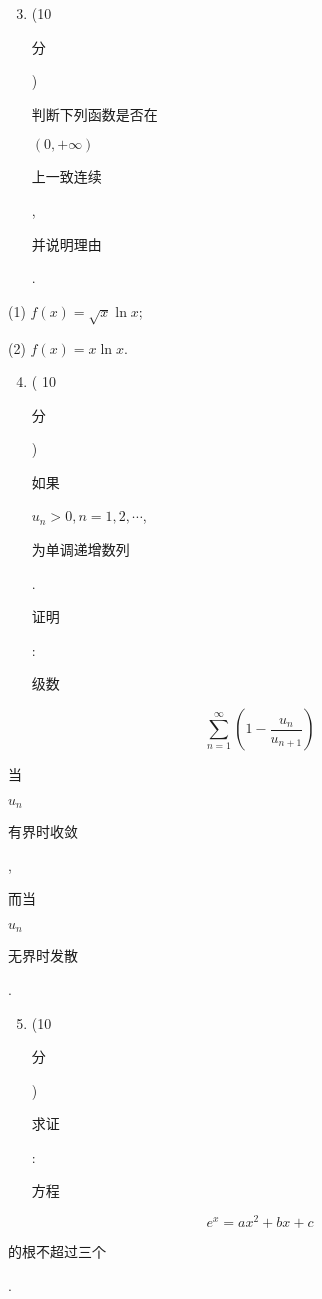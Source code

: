 \documentclass[10pt]{article}
\begin{document}
\begin{enumerate}
  \setcounter{enumi}{2}
  \item (10 \begin{CJK}{UTF8}{mj}分\end{CJK}) \begin{CJK}{UTF8}{mj}判断下列函数是否在\end{CJK} $(0,+\infty)$ \begin{CJK}{UTF8}{mj}上一致连续\end{CJK}, \begin{CJK}{UTF8}{mj}并说明理由\end{CJK}.
\end{enumerate}
(1) $f(x)=\sqrt{x} \ln x$;

(2) $f(x)=x \ln x$.

\begin{enumerate}
  \setcounter{enumi}{3}
  \item ( 10 \begin{CJK}{UTF8}{mj}分\end{CJK}) \begin{CJK}{UTF8}{mj}如果\end{CJK} $u_{n}>0, n=1,2, \cdots$, \begin{CJK}{UTF8}{mj}为单调递增数列\end{CJK}. \begin{CJK}{UTF8}{mj}证明\end{CJK}: \begin{CJK}{UTF8}{mj}级数\end{CJK}
\end{enumerate}
$$
\sum_{n=1}^{\infty}\left(1-\frac{u_{n}}{u_{n+1}}\right)
$$
\begin{CJK}{UTF8}{mj}当\end{CJK} $u_{n}$ \begin{CJK}{UTF8}{mj}有界时收敛\end{CJK}, \begin{CJK}{UTF8}{mj}而当\end{CJK} $u_{n}$ \begin{CJK}{UTF8}{mj}无界时发散\end{CJK}.

\begin{enumerate}
  \setcounter{enumi}{4}
  \item (10 \begin{CJK}{UTF8}{mj}分\end{CJK}) \begin{CJK}{UTF8}{mj}求证\end{CJK}: \begin{CJK}{UTF8}{mj}方程\end{CJK}
\end{enumerate}
$$
e^{x}=a x^{2}+b x+c
$$
\begin{CJK}{UTF8}{mj}的根不超过三个\end{CJK}.
\end{document}
